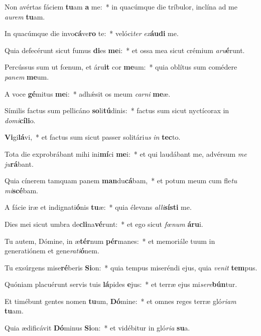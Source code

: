 \item Non avértas fáciem \textbf{tu}am \textbf{a} me:~* in quacúmque die tríbulor, inclína ad me \textit{au}\textit{rem} \textbf{tu}am.
\item In quacúmque die invo\textbf{cá}ve\textbf{ro} te:~* velóci\textit{ter} \textit{ex}\textbf{áu}\textbf{di} me.
\item Quia defecérunt sicut fumus \textbf{di}es \textbf{me}i:~* et ossa mea sicut crémium \textit{a}\textit{ru}\textbf{é}runt.
\item Percússus sum ut fœnum, et áru\textbf{it} cor \textbf{me}um:~* quia oblítus sum comédere \textit{pa}\textit{nem} \textbf{me}um.
\item A voce \textbf{gé}mitus \textbf{me}i:~* adhǽsit os meum \textit{car}\textit{ni} \textbf{me}æ.
\item Símilis factus sum pellicáno \textbf{so}li\textbf{tú}dinis:~* factus sum sicut nyctícorax in \textit{do}\textit{mi}\textbf{cí}\textbf{li}o.
\item \textbf{Vi}gi\textbf{lá}vi,~* et factus sum sicut passer solitári\textit{us} \textit{in} \textbf{tec}to.
\item Tota die exprobrábant mihi ini\textbf{mí}ci \textbf{me}i:~* et qui laudábant me, advérsum \textit{me} \textit{ju}\textbf{rá}bant.
\item Quia cínerem tamquam panem \textbf{man}du\textbf{cá}bam,~* et potum meum cum fle\textit{tu} \textit{mi}\textbf{scé}bam.
\item A fácie iræ et indignati\textbf{ó}nis \textbf{tu}æ:~* quia élevans \textit{al}\textit{li}\textbf{sís}\textbf{ti} me.
\item Dies mei sicut umbra de\textbf{cli}na\textbf{vé}runt:~* et ego sicut \textit{fœ}\textit{num} \textbf{á}\textbf{ru}i.
\item Tu autem, Dómine, in æ\textbf{tér}num \textbf{pér}manes:~* et memoriále tuum in generatiónem et gene\textit{ra}\textit{ti}\textbf{ó}nem.
\item Tu exsúrgens mise\textbf{ré}beris \textbf{Si}on:~* quia tempus miseréndi ejus, quia \textit{ve}\textit{nit} \textbf{tem}pus.
\item Quóniam placuérunt servis tuis \textbf{lá}pides \textbf{e}jus:~* et terræ ejus mi\textit{se}\textit{re}\textbf{bún}tur.
\item Et timébunt gentes nomen \textbf{tu}um, \textbf{Dó}mine:~* et omnes reges terræ gló\textit{ri}\textit{am} \textbf{tu}am.
\item Quia ædificávit \textbf{Dó}minus \textbf{Si}on:~* et vidébitur in gló\textit{ri}\textit{a} \textbf{su}a.

